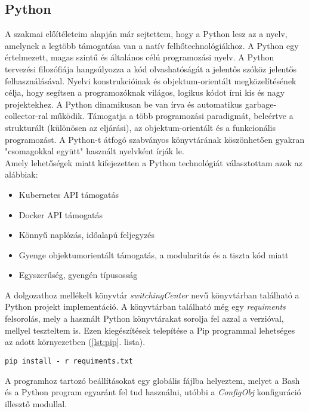 \subsection{Python}
A szakmai előítéleteim alapján már sejtettem, hogy a Python lesz az a nyelv, amelynek a legtöbb támogatása van a natív felhőtechnológiákhoz. A Python egy értelmezett, magas szintű és általános célú programozási nyelv. A Python tervezési filozófiája hangsúlyozza a kód olvashatóságát a jelentős szóköz jelentős felhasználásával. Nyelvi konstrukcióinak és objektum-orientált megközelítésének célja, hogy segítsen a programozóknak világos, logikus kódot írni kis és nagy projektekhez. A Python dinamikusan be van írva és automatikus garbage-collector-ral működik. Támogatja a több programozási paradigmát, beleértve a strukturált (különösen az eljárási), az objektum-orientált és a funkcionális programozást. A Python-t átfogó szabványos könyvtárának köszönhetően gyakran "csomagokkal együtt" használt nyelvként írják le. \cite{pwiki} \\

\noindent
Amely lehetőségek miatt kifejezetten a Python technológiát választottam azok az alábbiak:
\begin{itemize}
	\item Kubernetes API támogatás
	\item Docker API támogatás
	\item Könnyű naplózás, időalapú feljegyzés
	\item Gyenge objektumorientált támogatás, a modularitás és a tiszta kód miatt
	\item Egyszerűség, gyengén típusosság
\end{itemize}

\noindent
A dolgozathoz mellékelt könyvtár \emph{switchingCenter} nevű könyvtárban található a Python projekt implementáció. A könyvtárban található még egy \emph{requiments} felsorolás, mely a használt Python könyvtárakat sorolja fel azzal a verzióval, mellyel teszteltem is. Ezen kiegészítések telepítése a Pip programmal lehetséges az adott környezetben (\ref{lst:pip}. lista).

\begin{lstlisting}[caption={Python könyvtárak telepítése}, label={lst:pip}]
pip install - r requiments.txt
\end{lstlisting}

\noindent
A programhoz tartozó beállításokat egy globális fájlba helyeztem, melyet a Bash és a Python program egyaránt fel tud használni, utóbbi a \emph{ConfigObj} konfiguráció illesztő modullal.

